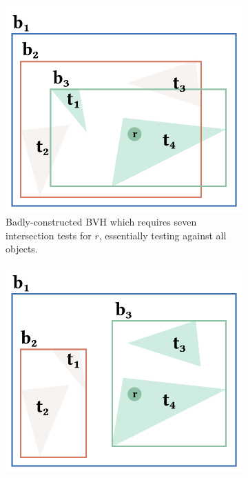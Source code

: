 \begin{figure}[H]
  \centering
  \begin{subfigure}[b]{0.45\textwidth}
      \includegraphics[width=\textwidth]{resources/bvh-bad-visualized.png}
      \caption{Badly-constructed \gls{BVH} which requires seven intersection tests for $r$, essentially testing against all objects.}
      \label{fig:bvhBad}
  \end{subfigure}
  \hfill
  \begin{subfigure}[b]{0.45\textwidth}
    \includegraphics[width=\textwidth]{resources/bvh-good-visualized.png}

\end{subfigure}
\end{figure}
